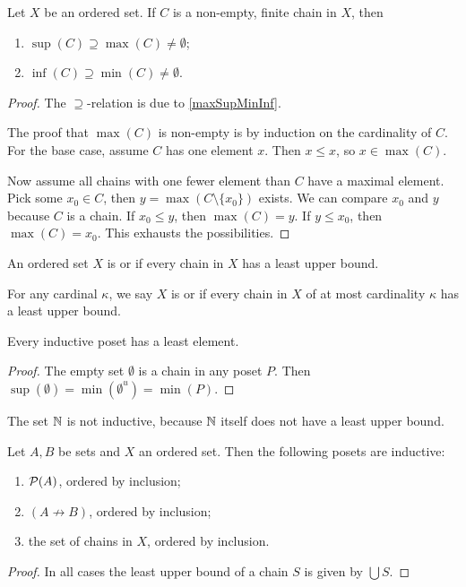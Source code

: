 \begin{lemma} \label{boundsFiniteChain}
Let $X$ be an ordered set. If $C$ is a non-empty, finite chain in $X$, then
\begin{enumerate}
\item $\sup(C) \supseteq \max(C) \neq \emptyset$;
\item $\inf(C) \supseteq \min(C) \neq \emptyset$.
\end{enumerate}
\end{lemma}
\begin{proof}
The $\supseteq$-relation is due to \ref{maxSupMinInf}.

The proof that $\max(C)$ is non-empty is by induction on the cardinality of $C$. For the base case, assume $C$ has one element $x$. Then $x \leq x$, so $x\in \max(C)$.

Now assume all chains with one fewer element than $C$ have a maximal element. Pick some $x_0\in C$, then $y = \max(C\setminus \{x_0\})$ exists. We can compare $x_0$ and $y$ because $C$ is a chain. If $x_0 \leq y$, then $\max(C) = y$. If $y \leq x_0$, then $\max(C) = x_0$. This exhausts the possibilities.
\end{proof}

\begin{definition}
An ordered set $X$ is  or  if every chain in $X$ has a least upper bound.

For any cardinal $\kappa$, we say $X$ is  or  if every chain in $X$ of at most cardinality $\kappa$ has a least upper bound.
\end{definition}

\begin{lemma}
Every inductive poset has a least element.
\end{lemma}
\begin{proof}
The empty set $\emptyset$ is a chain in any poset $P$. Then $\sup(\emptyset) = \min(\emptyset^u) = \min(P)$.
\end{proof}

\begin{example}
The set $\mathbb{N}$ is not inductive, because $\mathbb{N}$ itself does not have a least upper bound.
\end{example}

\begin{proposition} \label{inductive}
Let $A,B$ be sets and $X$ an ordered set. Then the following posets are inductive:
\begin{enumerate}
\item $\operatorname{\mathcal{P}}(A)$, ordered by inclusion;
\item $(A \not\to B)$, ordered by inclusion;
\item the set of chains in $X$, ordered by inclusion.
\end{enumerate}
\end{proposition}
\begin{proof}
In all cases the least upper bound of a chain $S$ is given by $\bigcup S$.
\end{proof}

